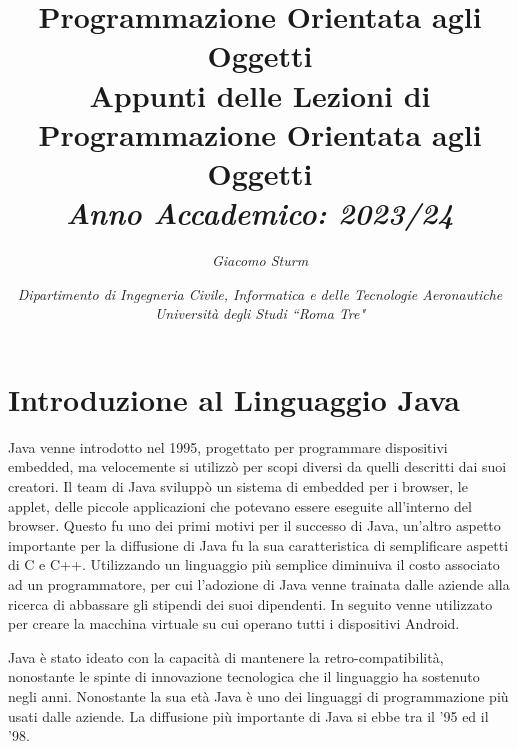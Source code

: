 \documentclass{article}
\numberwithin{equation}{subsection}
\begin{document}
\title{%
    \textbf{Programmazione Orientata agli Oggetti}  \\ 
    \large Appunti delle Lezioni di Programmazione Orientata agli Oggetti \\
    \textit{Anno Accademico: 2023/24}}
\author{\textit{Giacomo Sturm}}
\date{\textit{Dipartimento di Ingegneria Civile, Informatica e delle Tecnologie Aeronautiche \\
Università degli Studi ``Roma Tre"}}

\maketitle
\thispagestyle{link}

\clearpage

\pagestyle{fancy}
\fancyhead{}\fancyfoot{}
\fancyfoot[C]{\thepage}

\tableofcontents

\clearpage


\section{Introduzione al Linguaggio Java}

Java venne introdotto nel 1995, progettato per programmare dispositivi embedded, ma velocemente si utilizzò per scopi diversi da quelli descritti dai suoi 
creatori. Il team di Java sviluppò un sistema di embedded per i browser, le applet, delle piccole applicazioni che potevano essere eseguite all'interno 
del browser. Questo fu uno dei primi motivi per il successo di Java, un'altro aspetto importante per la diffusione di Java fu la sua caratteristica di 
semplificare aspetti di C e C++. Utilizzando un linguaggio più semplice diminuiva il costo associato ad un programmatore, per cui l'adozione di Java 
venne trainata dalle aziende alla ricerca di abbassare gli stipendi dei suoi dipendenti. In seguito venne utilizzato per creare la macchina virtuale su 
cui operano tutti i dispositivi Android. 

Java è stato ideato con la capacità di mantenere la retro-compatibilità, nonostante le spinte di innovazione tecnologica che il linguaggio ha sostenuto 
negli anni. Nonostante la sua età Java è uno dei linguaggi di programmazione più usati dalle aziende. 
La diffusione più importante di Java si ebbe tra il '95 ed il '98. 
\end{document}
